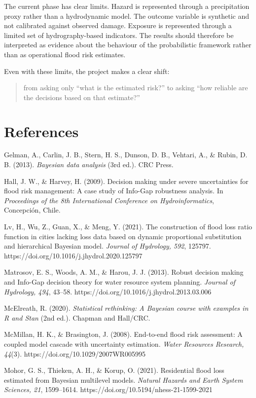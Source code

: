 \documentclass[
]{article}
\begin{document}
The current phase has clear limits. Hazard is represented through a
precipitation proxy rather than a hydrodynamic model. The outcome
variable is synthetic and not calibrated against observed damage.
Exposure is represented through a limited set of hydrography-based
indicators. The results should therefore be interpreted as evidence
about the behaviour of the probabilistic framework rather than as
operational flood risk estimates.

Even with these limits, the project makes a clear shift:

\begin{quote}
from asking only ``what is the estimated risk?'' to asking ``how
reliable are the decisions based on that estimate?''
\end{quote}

\section{References}\label{references}

Gelman, A., Carlin, J. B., Stern, H. S., Dunson, D. B., Vehtari, A., \&
Rubin, D. B. (2013). \emph{Bayesian data analysis} (3rd ed.). CRC Press.

Hall, J. W., \& Harvey, H. (2009). Decision making under severe
uncertainties for flood risk management: A case study of Info-Gap
robustness analysis. In \emph{Proceedings of the 8th International
Conference on Hydroinformatics}, Concepción, Chile.

Lv, H., Wu, Z., Guan, X., \& Meng, Y. (2021). The construction of flood
loss ratio function in cities lacking loss data based on dynamic
proportional substitution and hierarchical Bayesian model. \emph{Journal
of Hydrology, 592}, 125797.
https://doi.org/10.1016/j.jhydrol.2020.125797

Matrosov, E. S., Woods, A. M., \& Harou, J. J. (2013). Robust decision
making and Info-Gap decision theory for water resource system planning.
\emph{Journal of Hydrology, 494}, 43--58.
https://doi.org/10.1016/j.jhydrol.2013.03.006

McElreath, R. (2020). \emph{Statistical rethinking: A Bayesian course
with examples in R and Stan} (2nd ed.). Chapman and Hall/CRC.

McMillan, H. K., \& Brasington, J. (2008). End-to-end flood risk
assessment: A coupled model cascade with uncertainty estimation.
\emph{Water Resources Research, 44}(3).
https://doi.org/10.1029/2007WR005995

Mohor, G. S., Thieken, A. H., \& Korup, O. (2021). Residential flood
loss estimated from Bayesian multilevel models. \emph{Natural Hazards
and Earth System Sciences, 21}, 1599--1614.
https://doi.org/10.5194/nhess-21-1599-2021
\end{document}
